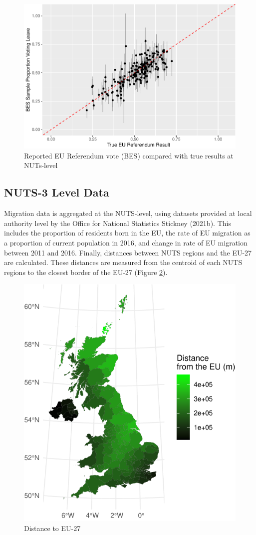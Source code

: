 \documentclass{article}
\begin{document}
\begin{figure}

{\centering \includegraphics[width=0.8\linewidth]{SCI-and-Leave-Voting_files/figure-latex/bes_validity-1} 

}

\caption{Reported EU Referendum vote (BES) compared with true results at NUTs-level}\label{fig:bes_validity}
\end{figure}

\hypertarget{nuts-3-level-data}{%
\subsection{NUTS-3 Level Data}\label{nuts-3-level-data}}

Migration data is aggregated at the NUTS-level, using datasets provided
at local authority level by the Office for National Statistics Stickney
(2021b). This includes the proportion of residents born in the EU, the
rate of EU migration as a proportion of current population in 2016, and
change in rate of EU migration between 2011 and 2016. Finally, distances
between NUTS regions and the EU-27 are calculated. These distances are
measured from the centroid of each NUTS regions to the closest border of
the EU-27 (Figure \ref{fig:distances}).

\begin{figure}

{\centering \includegraphics[width=0.5\linewidth]{SCI-and-Leave-Voting_files/figure-latex/distances-1} 

}

\caption{Distance to EU-27}\label{fig:distances}
\end{figure}
\end{document}
